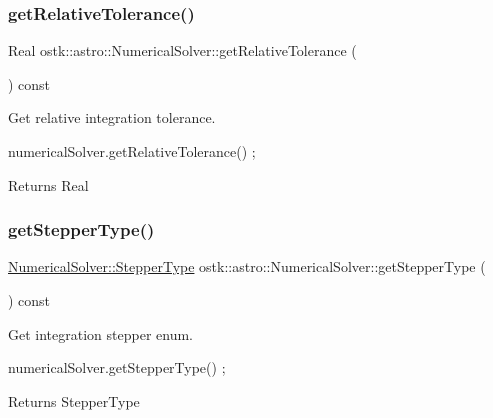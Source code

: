 \subsubsection{\texorpdfstring{get\+Relative\+Tolerance()}{getRelativeTolerance()}}
{\footnotesize\ttfamily Real ostk\+::astro\+::\+Numerical\+Solver\+::get\+Relative\+Tolerance (\begin{DoxyParamCaption}{ }\end{DoxyParamCaption}) const}



Get relative integration tolerance. 


\begin{DoxyCode}
numericalSolver.getRelativeTolerance() ;
\end{DoxyCode}


\begin{DoxyReturn}{Returns}
Real 
\end{DoxyReturn}
\mbox{\label{classostk_1_1astro_1_1_numerical_solver_adb327bb6a9dc0fc4ab8fca57030b51e6}} 
\subsubsection{\texorpdfstring{get\+Stepper\+Type()}{getStepperType()}}
{\footnotesize\ttfamily \hyperlink{classostk_1_1astro_1_1_numerical_solver_afb80f81b2c3cc1d356b0b4749e45b947}{Numerical\+Solver\+::\+Stepper\+Type} ostk\+::astro\+::\+Numerical\+Solver\+::get\+Stepper\+Type (\begin{DoxyParamCaption}{ }\end{DoxyParamCaption}) const}



Get integration stepper enum. 


\begin{DoxyCode}
numericalSolver.getStepperType() ;
\end{DoxyCode}


\begin{DoxyReturn}{Returns}
Stepper\+Type 
\end{DoxyReturn}
\mbox{\label{classostk_1_1astro_1_1_numerical_solver_a1caf9f97b27630a5baa4444e76fe9ad4}} 
